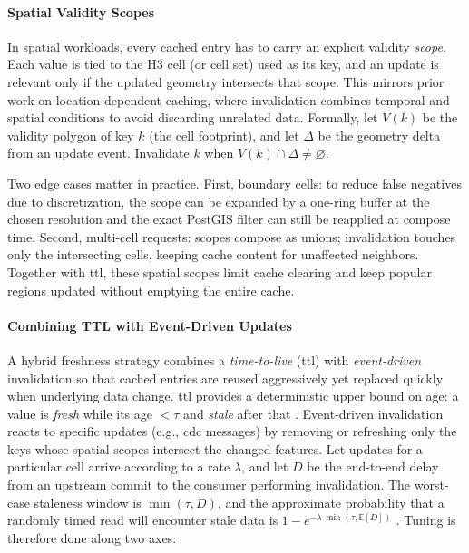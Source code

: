\paragraph{Spatial Validity Scopes}
In spatial workloads, every cached entry has to carry an explicit validity \emph{scope}. Each value is tied to the H3 cell (or cell set) used as its key, and an update is relevant only if the updated geometry intersects that scope. This mirrors prior work on location-dependent caching, where invalidation combines temporal and spatial conditions to avoid discarding unrelated data. Formally, let $V(k)$ be the validity polygon of key $k$ (the cell footprint), and let $\Delta$ be the geometry delta from an update event. Invalidate $k$ when $V(k)\cap \Delta \neq \varnothing$.

Two edge cases matter in practice. First, boundary cells: to reduce false negatives due to discretization, the scope can be expanded by a one-ring buffer at the chosen resolution and the exact PostGIS filter can still be reapplied at compose time. Second, multi-cell requests: scopes compose as unions; invalidation touches only the intersecting cells, keeping cache content for unaffected neighbors. Together with \ac{ttl}, these spatial scopes limit cache clearing and keep popular regions updated without emptying the entire cache.

\paragraph{Combining TTL with Event-Driven Updates}
A hybrid freshness strategy combines a \emph{time-to-live} (\ac{ttl}) with \emph{event-driven} invalidation so that cached entries are reused aggressively yet replaced quickly when underlying data change. \ac{ttl} provides a deterministic upper bound on age: a value is \emph{fresh} while its age $<\tau$ and \emph{stale} after that \cite{RFC9111_HTTP_Caching}. Event-driven invalidation reacts to specific updates (e.g., \ac{cdc} messages) by removing or refreshing only the keys whose spatial scopes intersect the changed features. Let updates for a particular cell arrive according to a rate $\lambda$, and let $D$ be the end-to-end delay from an upstream commit to the consumer performing invalidation. The worst-case staleness window is $\min(\tau,D)$, and the approximate probability that a randomly timed read will encounter stale data is $1-e^{-\lambda\,\min(\tau,\mathbb{E}[D])}$ \cite{PishroNik_PoissonProcess_Basics}. Tuning is therefore done along two axes:

